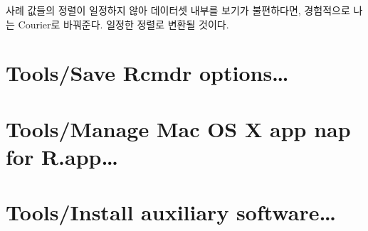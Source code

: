 \documentclass[
]{book}
\begin{document}
사례 값들의 정렬이 일정하지 않아 데이터셋 내부를 보기가 불편하다면, 경험적으로 나는 Courier로 바꿔준다. 일정한 정렬로 변환될 것이다.

\hypertarget{toolssave-rcmdr-options}{%
\section{Tools/Save Rcmdr options\ldots{}}\label{toolssave-rcmdr-options}}

\hypertarget{toolsmanage-mac-os-x-app-nap-for-r.app}{%
\section{Tools/Manage Mac OS X app nap for R.app\ldots{}}\label{toolsmanage-mac-os-x-app-nap-for-r.app}}

\hypertarget{toolsinstall-auxiliary-software}{%
\section{Tools/Install auxiliary software\ldots{}}\label{toolsinstall-auxiliary-software}}

  
\end{document}
